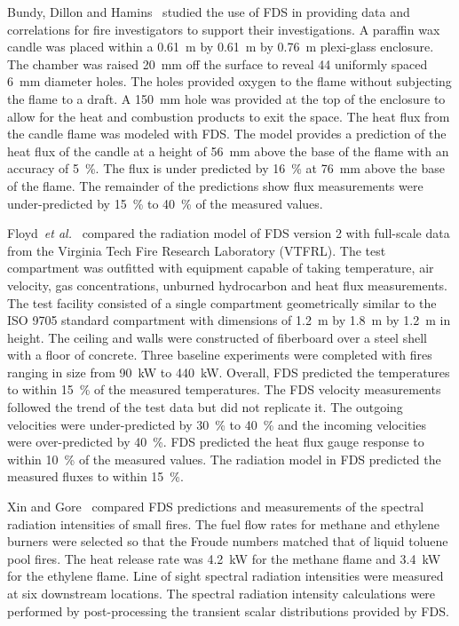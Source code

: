 Bundy,  Dillon and  Hamins~\cite{Dillon:1,Hamins:FPE2005}  studied the use of FDS  in providing data and correlations  for fire investigators to
support their investigations.   A paraffin  wax candle  was placed within  a  0.61~m by  0.61~m  by  0.76~m  plexi-glass enclosure.   The chamber was
raised 20~mm off the surface to reveal 44 uniformly spaced 6~mm diameter holes.   The holes provided oxygen to  the flame without subjecting the
flame to a draft.   A 150~mm hole was  provided at the top of the enclosure to allow  for the heat and combustion products to exit the space.  The
heat flux  from the candle flame was modeled with FDS.  The model  provides a prediction of the heat  flux of the candle at a height of  56~mm above
the base of the flame  with an accuracy of 5~\%. The flux is under predicted  by 16~\% at 76~mm above the base of the  flame. The remainder  of the
predictions show  flux measurements were under-predicted by 15~\% to 40~\% of the measured values.

Floyd~{\em et al.}~\cite{Floyd:1,Floyd:6} compared the radiation model of  FDS version 2  with full-scale  data from  the Virginia  Tech Fire
Research Laboratory (VTFRL).  The  test compartment was outfitted with equipment   capable   of  taking   temperature,   air  velocity,   gas
concentrations, unburned hydrocarbon  and heat flux measurements.  The test facility consisted of  a single compartment geometrically similar to the
ISO 9705 standard compartment with dimensions of 1.2~m by 1.8~m by  1.2~m  in height.   The  ceiling  and  walls were  constructed  of fiberboard
over  a steel  shell  with  a  floor of  concrete.   Three baseline experiments  were completed with  fires ranging in  size from 90~kW  to 440~kW.
Overall,  FDS  predicted  the  temperatures  to within  15~\%  of  the measured  temperatures.  The  FDS velocity  measurements  followed the trend
of  the test  data  but did  not  replicate  it.  The  outgoing velocities  were under-predicted by  30~\% to  40~\% and  the incoming velocities
were  over-predicted by 40~\%. FDS predicted  the heat flux gauge response to within 10~\%  of the measured values.  The radiation model  in FDS
predicted the  measured  fluxes to  within 15~\%.

Xin   and  Gore~\cite{Xin:JSS2003}   compared   FDS  predictions   and measurements  of the  spectral radiation  intensities of  small fires. The
fuel flow rates for  methane and ethylene burners were selected so that the  Froude numbers  matched that of  liquid toluene  pool fires. The heat
release rate was 4.2~kW  for the methane flame and 3.4~kW for the ethylene flame.  Line of sight spectral radiation intensities were measured  at
six  downstream  locations.    The  spectral  radiation intensity calculations were performed by post-processing the transient scalar  distributions
provided  by FDS.


